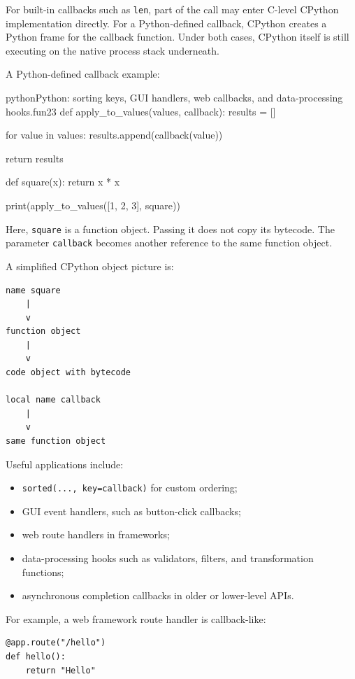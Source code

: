 \documentclass[a4paper,twoside]{report}
\begin{document}
For built-in callbacks such as \texttt{len}, part of the call may enter C-level CPython implementation directly. For a Python-defined callback, CPython creates a Python frame for the callback function. Under both cases, CPython itself is still executing on the native process stack underneath.

A Python-defined callback example:

\begin{codebox}[]{python}{Python: sorting keys, GUI handlers, web callbacks, and data-processing hooks.}{fun23}
def apply_to_values(values, callback):
    results = []

    for value in values:
        results.append(callback(value))

    return results


def square(x):
    return x * x


print(apply_to_values([1, 2, 3], square))
\end{codebox}


Here, \texttt{square} is a function object. Passing it does not copy its bytecode. The parameter \texttt{callback} becomes another reference to the same function object.

A simplified CPython object picture is:

\begin{verbatim}
name square
    |
    v
function object
    |
    v
code object with bytecode

local name callback
    |
    v
same function object
\end{verbatim}

Useful applications include:

\begin{itemize}
    \item \texttt{sorted(..., key=callback)} for custom ordering;
    \item GUI event handlers, such as button-click callbacks;
    \item web route handlers in frameworks;
    \item data-processing hooks such as validators, filters, and transformation functions;
    \item asynchronous completion callbacks in older or lower-level APIs.
\end{itemize}

For example, a web framework route handler is callback-like:

\begin{verbatim}
@app.route("/hello")
def hello():
    return "Hello"
\end{verbatim}
\end{document}
